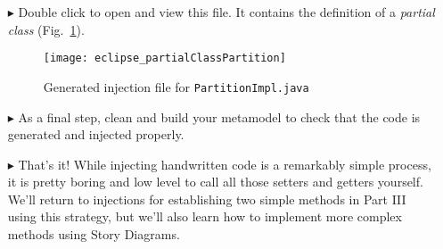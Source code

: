 \begin{itemize}
\item[$\blacktriangleright$] Double click to open and view this file. It contains the definition of a \textit{partial class}
(Fig.~\ref{eclipse:injection_partialClassPartition}).

\begin{figure}[htbp]
    \centering
    \texttt{[image: eclipse\_partialClassPartition]}
    \caption{Generated injection file for \texttt{PartitionImpl.java}}
    \label{eclipse:injection_partialClassPartition}
\end{figure}

\clearpage

\item[$\blacktriangleright$] As a final step, clean and build your metamodel to check that the code is generated and injected properly.

\item[$\blacktriangleright$] That's it! While injecting handwritten code is a remarkably simple process, it is pretty boring and low level to call all those
setters and getters yourself. We'll return to injections for establishing two simple methods in Part III using this strategy, but we'll also learn how to
implement more complex methods using Story Diagrams.
 
\end{itemize}
